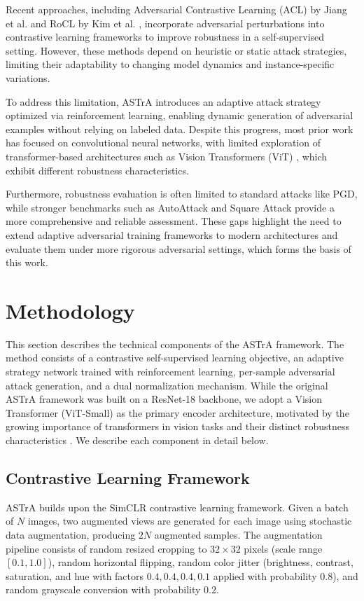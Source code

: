 \documentclass[conference]{IEEEtran}
\begin{document}
Recent approaches, including Adversarial Contrastive Learning (ACL) by Jiang et al. \cite{b4} and RoCL by Kim et al. \cite{b2}, incorporate adversarial perturbations into contrastive learning frameworks to improve robustness in a self-supervised setting. However, these methods depend on heuristic or static attack strategies, limiting their adaptability to changing model dynamics and instance-specific variations.

To address this limitation, ASTrA introduces an adaptive attack strategy optimized via reinforcement learning, enabling dynamic generation of adversarial examples without relying on labeled data. Despite this progress, most prior work has focused on convolutional neural networks, with limited exploration of transformer-based architectures such as Vision Transformers (ViT) \cite{b10}, which exhibit different robustness characteristics.

Furthermore, robustness evaluation is often limited to standard attacks like PGD, while stronger benchmarks such as AutoAttack \cite{b11} and Square Attack \cite{b12} provide a more comprehensive and reliable assessment. These gaps highlight the need to extend adaptive adversarial training frameworks to modern architectures and evaluate them under more rigorous adversarial settings, which forms the basis of this work.

\section{Methodology}

This section describes the technical components of the ASTrA framework. The method consists of a contrastive self-supervised learning objective, an adaptive strategy network trained with reinforcement learning, per-sample adversarial attack generation, and a dual normalization mechanism. While the original ASTrA framework was built on a ResNet-18 backbone, we adopt a Vision Transformer (ViT-Small) as the primary encoder architecture, motivated by the growing importance of transformers in vision tasks and their distinct robustness characteristics \cite{b6}. We describe each component in detail below.

\subsection{Contrastive Learning Framework}

ASTrA builds upon the SimCLR \cite{b9} contrastive learning framework. Given a batch of $N$ images, two augmented views are generated for each image using stochastic data augmentation, producing $2N$ augmented samples. The augmentation pipeline consists of random resized cropping to $32 \times 32$ pixels (scale range $[0.1, 1.0]$), random horizontal flipping, random color jitter (brightness, contrast, saturation, and hue with factors $0.4, 0.4, 0.4, 0.1$ applied with probability $0.8$), and random grayscale conversion with probability $0.2$.
\end{document}
